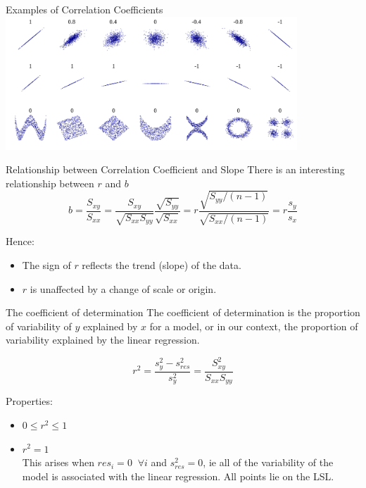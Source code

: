 \documentclass[t,xcolor=pdftex,dvipsnames,table]{beamer}\usepackage[]{graphicx}\usepackage[]{color}
\begin{document}
\begin{frame}[fragile]{Examples of Correlation Coefficients}
\includegraphics[height=5cm]{../images/CorrelationChart.jpg}

\href{https://en.wikipedia.org/wiki/Pearson_product-moment_correlation_coefficient}{}
\end{frame} 

\begin{frame}[fragile]{Relationship between Correlation Coefficient and Slope}
There is an interesting relationship between $r$ and $b$
\[ b =  \frac{ S_{xy} }{ S_{xx}  }
= \frac{ S_{xy} }{\sqrt{ S_{xx} S_{yy}} }   \frac{ \sqrt{ S_{yy} } }{ \sqrt{ S_{xx} } }
= r \frac{ \sqrt{ S_{yy}/(n-1)} }{ \sqrt{ S_{xx}/(n-1) }  }
= r \frac{ s_{y}}{s_{x}} \]

Hence:
\begin{itemize}
\item 
The sign of $r$ reflects the trend (slope) of the data.
\item
$r$ is unaffected by a change of scale or origin.
\end{itemize}
\end{frame} 

\begin{frame}[fragile]{The coefficient of determination}
The coefficient of determination is the proportion of variability of $y$ explained by $x$ for a model, or in our context, the proportion of variability explained by the linear regression. 

\[ \boxed{  r^2 = \frac{s_{y}^2 - s_{res}^2}{s_{y}^2} = \frac{S_{xy}^2}{S_{xx} S_{yy}}  }\]

Properties:
\begin{itemize}
\item $0 \leq r^2 \leq 1$ \\

\item  $r^2=1$ \\
This arises when $res_i=0 \;\; \forall i$ and $s_{res}^2=0$, ie all of the variability of the model is associated with the linear regression.
All points lie on the LSL.
\end{itemize}
\end{frame} 
\end{document}
